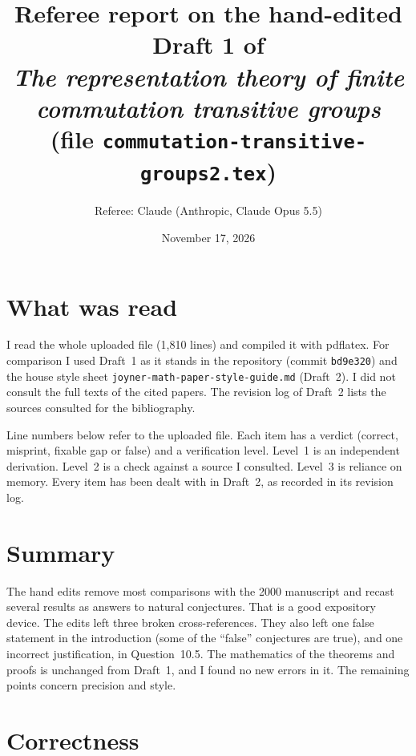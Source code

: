 \documentclass[12pt,letterpaper]{article}
\title{Referee report on the hand-edited Draft 1 of\\
\emph{The representation theory of finite commutation transitive groups}\\
(file \texttt{commutation-transitive-groups2.tex})}
\author{Referee: Claude (Anthropic, Claude Opus 5.5)}
\date{November 17, 2026}
\begin{document}
\maketitle

\section*{What was read}

I read the whole uploaded file (1,810 lines) and compiled it with pdflatex.
For comparison I used Draft~1 as it stands in the repository (commit
\texttt{bd9e320}) and the house style sheet
\texttt{joyner-math-paper-style-guide.md} (Draft~2). I did not consult the
full texts of the cited papers. The revision log of Draft~2 lists the
sources consulted for the bibliography.

Line numbers below refer to the uploaded file. Each item has a verdict
(correct, misprint, fixable gap or false) and a verification level. Level~1
is an independent derivation. Level~2 is a check against a source I
consulted. Level~3 is reliance on memory. Every item has been dealt with in
Draft~2, as recorded in its revision log.

\section*{Summary}

The hand edits remove most comparisons with the 2000 manuscript and recast
several results as answers to natural conjectures. That is a good
expository device. The edits left three broken cross-references. They also
left one false statement in the introduction (some of the ``false''
conjectures are true), and one incorrect justification, in
Question~10.5. The mathematics of the theorems and proofs is unchanged from
Draft~1, and I found no new errors in it. The remaining points concern
precision and style.

\section{Correctness}
\end{document}
